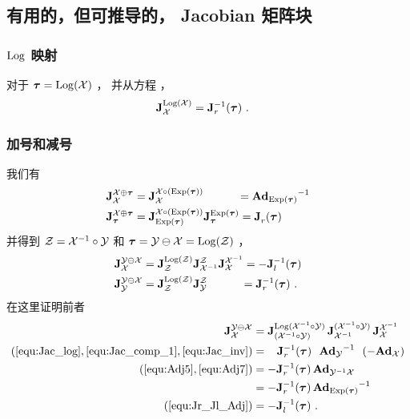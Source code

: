 \subsection{有用的，但可推导的， Jacobian 矩阵块}

\subsubsection[Log map]{$\Log$ 映射}

对于 $\bftau=\Log(\cX)$ ，
并从方程  ，
%
\begin{align}\label{equ:Jac_log}
\mjac{\Log(\cX)}{\cX} 
&= \mjac{-1}{r}(\bftau) 
~.
\end{align}

\subsubsection{加号和减号}

我们有
%
\begin{align}
\mjac{\cX\op\bftau}{\cX}
  &= \mjac{\cX\circ(\Exp(\bftau))}{\cX} 
  ~~~~~~~~~= \Ad[\cM]{\Exp(\bftau)}\inv \\
\mjac{\cX\op\bftau}{\bftau}
  &= \mjac{\cX\circ(\Exp(\bftau))}{\Exp(\bftau)}\mjac{\Exp(\bftau)}{\bftau}
  = \mjac{}{r}(\bftau) 
\end{align}
%
并得到 $\cZ=\cX\inv\circ\cY$ 和 $\bftau=\cY\om\cX=\Log(\cZ)$ ，
%
\begin{align}
\mjac{\cY\om\cX}{\cX}
  &= \mjac{\Log(\cZ)}{\cZ}\mjac{\cZ}{\cX\inv}\mjac{\cX\inv}{\cX} 
   = -\mjac{-1}{l}(\bftau)
  \\
\mjac{\cY\om\cX}{\cY}
  &= \mjac{\Log(\cZ)}{\cZ}\mjac{\cZ}{\cY} 
  ~~~~~~~~~= \mjac{-1}{r}(\bftau)
~.
\end{align}
%
在这里证明前者
%
\begin{align*}
\mjac{\cY\om\cX}{\cX}
  &= \mjac{\Log(\cX\inv\circ\cY)}{(\cX\inv\circ\cY)}\,\mjac{(\cX\inv\circ\cY)}{\cX\inv}\,\mjac{\cX\inv}{\cX} 
 \notag\\ 
 (\ref{equ:Jac_log},\ref{equ:Jac_comp_1},\ref{equ:Jac_inv})
  &= ~~\,\mjac{-1}{r}(\bftau)~~\Ad[\cM]{\cY}\inv~~(-\Ad[\cM]{\cX}) 
 \notag\\ 
 (\ref{equ:Adj5},\ref{equ:Adj7})
  &= -\mjac{-1}{r}(\bftau)\,\Ad[\cM]{\cY\inv\cX} 
 \notag\\ 
  &= -\mjac{-1}{r}(\bftau)\,\Ad[\cM]{\Exp(\bftau)}\inv
  \notag\\
 (\ref{equ:Jr_Jl_Adj})
  &
  =  -\mjac{-1}{l}(\bftau)
  ~.
\end{align*}




